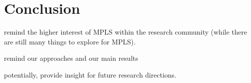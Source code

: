 \section{Conclusion}\label{ccl}
remind the higher interest of MPLS within the research community (while there
are still many things to explore for MPLS).

remind our approaches and our main results

potentially, provide insight for future research directions.
